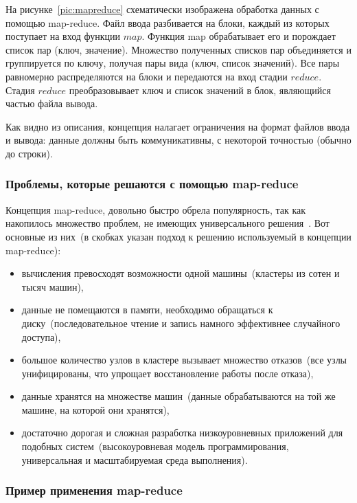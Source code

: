 \documentclass[12pt,a4paper,oneside]{extarticle}
\begin{document}
        На рисунке~\ref{pic:mapreduce} схематически изображена обработка данных с помощью map-reduce. Файл ввода разбивается на блоки, каждый из которых поступает на вход функции $map$. Функция map обрабатывает его и порождает список пар (ключ, значение). Множество полученных списков пар объединяется и группируется по ключу, получая пары вида (ключ, список значений). Все пары равномерно распределяются на блоки и передаются на вход стадии $reduce$. Стадия $reduce$ преобразовывает ключ и список значений в блок, являющийся частью файла вывода.

        Как видно из описания, концепция налагает ограничения на формат файлов ввода и вывода: данные должны быть коммуникативны, с некоторой точностью (обычно до строки).

        \subsubsection{Проблемы, которые решаются с помощью map-reduce}
            Концепция map-reduce, довольно быстро обрела популярность, так как накопилось множество проблем, не имеющих универсального решения~\cite{problem}. Вот основные из них~(в скобках указан подход к решению используемый в концепции map-reduce):

            \begin{itemize}
                \item вычисления превосходят возможности одной машины~(кластеры из сотен и тысяч машин),
                \item данные не помещаются в памяти, необходимо обращаться к диску~(последовательное чтение и запись намного эффективнее случайного доступа),
                \item большое количество узлов в кластере вызывает множество отказов~(все узлы унифицированы, что упрощает восстановление работы после отказа),
                \item данные хранятся на множестве машин~(данные обрабатываются на той же машине, на которой они хранятся),
                \item достаточно дорогая и сложная разработка низкоуровневных приложений для подобных систем~(высокоуровневая модель программирования, универсальная и масштабируемая среда выполнения).
            \end{itemize} 

        \subsubsection{Пример применения map-reduce}
\end{document}
